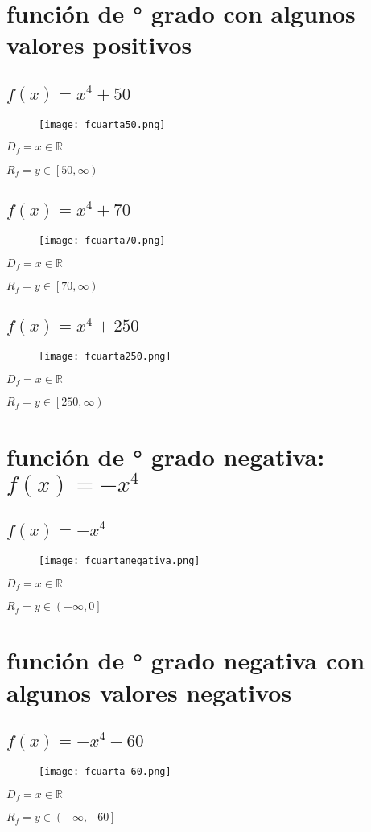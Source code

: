 \documentclass[12pt]{article}
\begin{document}
\section{función de {° grado} con algunos {\cyan valores positivos}}
\subsection{$f(x) = x^4 + 50$}
\begin{figure}[htb] \centering \texttt{[image: fcuarta50.png]} 
\end{figure}
$D_f = x \in \mathbb{R}$ \par
$R_f = y \in \left[50,\infty\right)$
\subsection{$f(x) = x^4 + 70$}
\begin{figure}[htb] \centering \texttt{[image: fcuarta70.png]} 
\end{figure}
$D_f = x \in \mathbb{R}$ \par
$R_f = y \in \left[70,\infty\right)$
\subsection{$f(x) = x^4 + 250$}
\begin{figure}[htb] \centering \texttt{[image: fcuarta250.png]} 
\end{figure}
$D_f = x \in \mathbb{R}$ \par
$R_f = y \in \left[250,\infty\right)$
\newpage
\section{función de {° grado negativa}: $f(x) = -x^4$}
\subsection{$f(x) = -x^4$}
\begin{figure}[htb] \centering \texttt{[image: fcuartanegativa.png]} 
\end{figure}
$D_f = x \in \mathbb{R}$ \par
$R_f = y \in \left(-\infty,0\right]$
\section{función de {° grado negativa} con algunos {\cyan valores negativos}}
\subsection{$f(x) = -x^4 - 60$}
\begin{figure}[htb] \centering \texttt{[image: fcuarta-60.png]} 
\end{figure}
$D_f = x \in \mathbb{R}$ \par
$R_f = y \in \left(-\infty,-60\right]$
\end{document}
